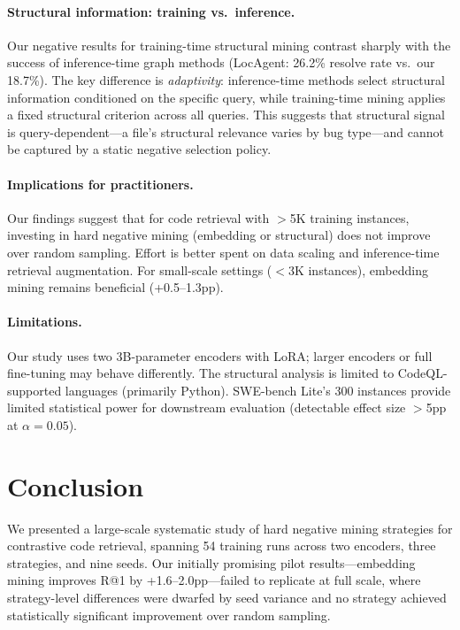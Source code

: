 \documentclass[11pt,a4paper]{article}
\begin{document}
\paragraph{Structural information: training vs.\ inference.}
Our negative results for training-time structural mining contrast sharply with the success of inference-time graph methods (LocAgent: 26.2\% resolve rate vs.\ our 18.7\%).
The key difference is \emph{adaptivity}: inference-time methods select structural information conditioned on the specific query, while training-time mining applies a fixed structural criterion across all queries.
This suggests that structural signal is query-dependent---a file's structural relevance varies by bug type---and cannot be captured by a static negative selection policy.

\paragraph{Implications for practitioners.}
Our findings suggest that for code retrieval with $>$5K training instances, investing in hard negative mining (embedding or structural) does not improve over random sampling.
Effort is better spent on data scaling and inference-time retrieval augmentation.
For small-scale settings ($<$3K instances), embedding mining remains beneficial (+0.5--1.3pp).

\paragraph{Limitations.}
Our study uses two 3B-parameter encoders with LoRA; larger encoders or full fine-tuning may behave differently.
The structural analysis is limited to CodeQL-supported languages (primarily Python).
SWE-bench Lite's 300 instances provide limited statistical power for downstream evaluation (detectable effect size $>$5pp at $\alpha = 0.05$).


\section{Conclusion}

We presented a large-scale systematic study of hard negative mining strategies for contrastive code retrieval, spanning 54 training runs across two encoders, three strategies, and nine seeds.
Our initially promising pilot results---embedding mining improves R@1 by +1.6--2.0pp---failed to replicate at full scale, where strategy-level differences were dwarfed by seed variance and no strategy achieved statistically significant improvement over random sampling.
\end{document}
